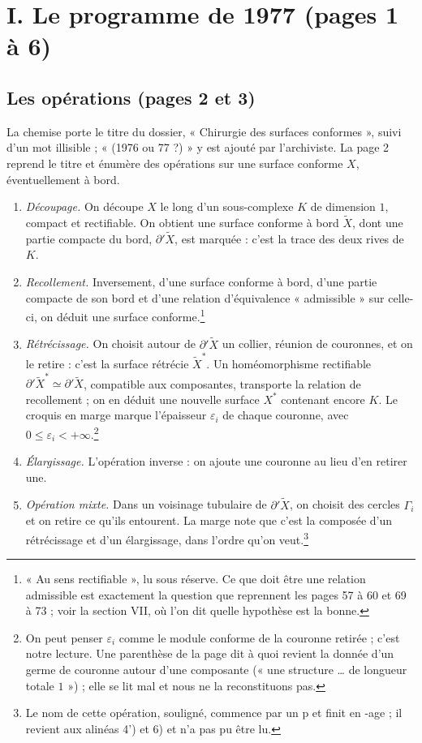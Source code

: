 \documentclass[11pt,a4paper]{article}
\begin{document}
\section*{I. Le programme de 1977 (pages 1 à 6)}

\subsection*{Les opérations (pages 2 et 3)}

La chemise porte le titre du dossier, « Chirurgie des surfaces conformes »,
suivi d'un mot illisible ; « (1976 ou 77 ?) » y est ajouté par
l'archiviste. La page 2 reprend le titre
et énumère des opérations sur une surface conforme $X$, éventuellement à
bord.

\begin{enumerate}
  \item \emph{Découpage.} On découpe $X$ le long d'un sous-complexe $K$ de
  dimension $1$, compact et rectifiable. On obtient une surface conforme à
  bord $\widetilde{X}$, dont une partie compacte du bord, $\partial'
  \widetilde{X}$, est marquée : c'est la trace des deux rives de $K$.
  \item \emph{Recollement.} Inversement, d'une surface conforme à bord, d'une
  partie compacte de son bord et d'une relation d'équivalence
  « admissible » sur celle-ci, on déduit une surface conforme.\footnote{« Au
  sens rectifiable », lu sous réserve. Ce que doit être une relation
  admissible est exactement la question que reprennent les pages 57 à 60 et
  69 à 73 ; voir la section VII, où l'on dit quelle hypothèse est la bonne.}
  \item \emph{Rétrécissage.} On choisit autour de $\partial'\widetilde{X}$ un
  collier, réunion de couronnes, et on le retire : c'est la surface rétrécie
  $\widetilde{X}^{*}$. Un homéomorphisme rectifiable $\partial'
  \widetilde{X}^{*} \simeq \partial'\widetilde{X}$, compatible aux
  composantes, transporte la relation de recollement ; on en déduit une
  nouvelle surface $X^{*}$ contenant encore $K$. Le croquis en marge marque
  l'épaisseur $\varepsilon_i$ de chaque couronne, avec
  $0 \leqslant \varepsilon_i < +\infty$.\footnote{On peut penser
  $\varepsilon_i$ comme le module conforme de la couronne retirée ; c'est
  notre lecture. Une parenthèse de la page dit à quoi revient la donnée d'un
  germe de couronne autour d'une composante (« une structure … de
  longueur totale $1$ ») ; elle se lit mal et nous ne la reconstituons pas.}
  \item \emph{Élargissage.} L'opération inverse : on ajoute une couronne au
  lieu d'en retirer une.
  \item \emph{Opération mixte.} Dans un voisinage tubulaire de
  $\partial'\widetilde{X}$, on choisit des cercles $\Gamma_i$ et on retire
  ce qu'ils entourent. La marge note que c'est la composée d'un rétrécissage
  et d'un élargissage, dans l'ordre qu'on veut.\footnote{Le nom de cette
  opération, souligné, commence par un p et finit en -age ; il revient aux
  alinéas 4') et 6) et n'a pas pu être lu.}
\end{enumerate}
\end{document}
